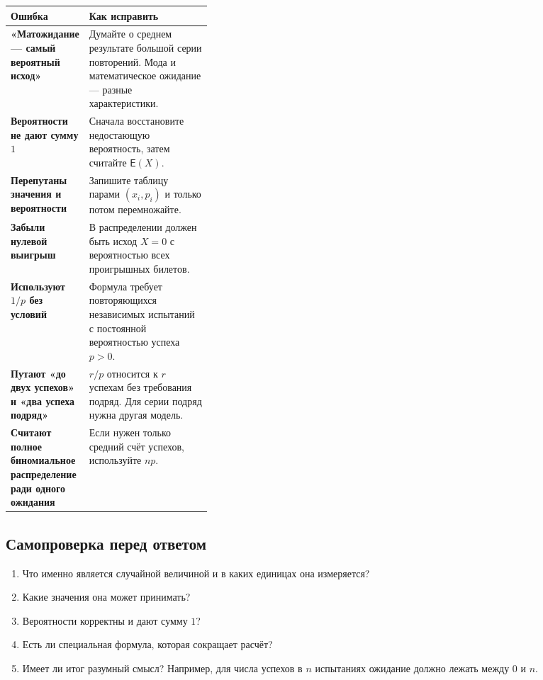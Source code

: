 \documentclass[a4paper,12pt]{article}
\newcommand{\E}{\mathsf{E}}
\begin{document}
\begin{tabularx}{\linewidth}{>{\bfseries\color{warn}}p{0.33\linewidth}X}
\toprule
Ошибка & Как исправить \\
\midrule
«Матожидание --- самый вероятный исход» & Думайте о среднем результате большой серии повторений. Мода и математическое ожидание --- разные характеристики. \\

Вероятности не дают сумму $1$ & Сначала восстановите недостающую вероятность, затем считайте $\E(X)$. \\

Перепутаны значения и вероятности & Запишите таблицу парами $(x_i,p_i)$ и только потом перемножайте. \\

Забыли нулевой выигрыш & В распределении должен быть исход $X=0$ с вероятностью всех проигрышных билетов. \\

Используют $1/p$ без условий & Формула требует повторяющихся независимых испытаний с постоянной вероятностью успеха $p>0$. \\

Путают «до двух успехов» и «два успеха подряд» & $r/p$ относится к $r$ успехам без требования подряд. Для серии подряд нужна другая модель. \\

Считают полное биномиальное распределение ради одного ожидания & Если нужен только средний счёт успехов, используйте $np$. \\
\bottomrule
\end{tabularx}

\subsection*{Самопроверка перед ответом}
\begin{enumerate}
  \item Что именно является случайной величиной и в каких единицах она измеряется?
  \item Какие значения она может принимать?
  \item Вероятности корректны и дают сумму $1$?
  \item Есть ли специальная формула, которая сокращает расчёт?
  \item Имеет ли итог разумный смысл? Например, для числа успехов в $n$ испытаниях ожидание должно лежать между $0$ и $n$.
\end{enumerate}
\end{document}
